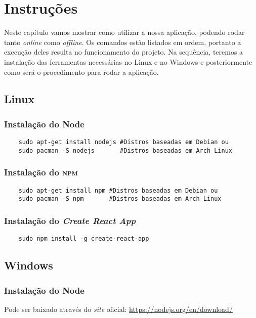 \chapter{Instruções}
Neste capítulo vamos mostrar como utilizar a nossa aplicação, podendo rodar
tanto \emph{online} como \emph{offline}. Os comandos estão listados em ordem,
portanto a execução deles resulta no funcionamento do projeto. Na sequência,
teremos a instalação das ferramentas necessárias no Linux e no Windows e
posteriormente como será o procedimento para rodar a aplicação.

\section{Linux}
\subsection{Instalação do Node}
\begin{verbatim}
	sudo apt-get install nodejs #Distros baseadas em Debian ou
	sudo pacman -S nodejs       #Distros baseadas em Arch Linux
\end{verbatim}

\subsection{Instalação do \textsc{npm}}
\begin{verbatim}
	sudo apt-get install npm #Distros baseadas em Debian ou
	sudo pacman -S npm       #Distros baseadas em Arch Linux
\end{verbatim}

\subsection{Instalação do \emph{Create React App}}
\begin{verbatim}
	sudo npm install -g create-react-app
\end{verbatim}

\section{Windows}
\subsection{Instalação do Node}
Pode ser baixado através do \emph{site} oficial:
\href{https://nodejs.org/en/download/}{https://nodejs.org/en/download/}

